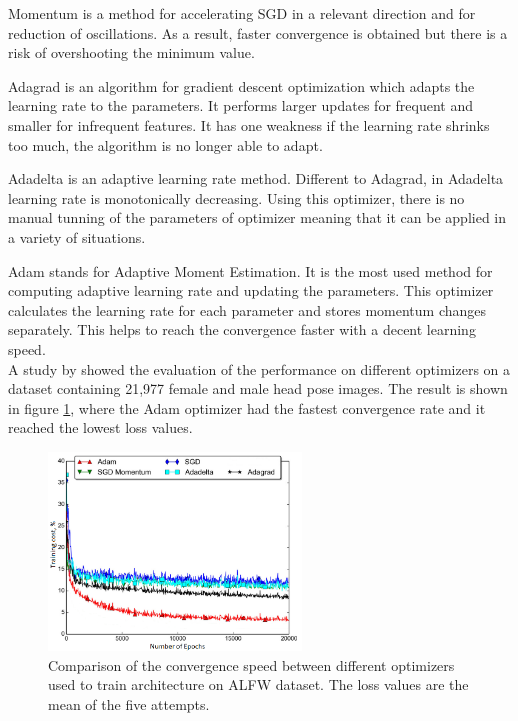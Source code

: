 \noindent
Momentum is a method for accelerating SGD in a relevant direction and for reduction of oscillations. As a result, faster convergence is obtained but there is a risk of overshooting the minimum value.\citep{Qian1999, Ruder2016}

\noindent
Adagrad is an algorithm for gradient descent optimization which adapts the learning rate to the parameters. It performs larger updates for frequent and smaller for infrequent features. It has one weakness if the learning rate shrinks too much, the algorithm is no longer able to adapt.\citep{Ruder2016}

\noindent
Adadelta is an adaptive learning rate method. Different to Adagrad, in Adadelta learning rate is monotonically decreasing. Using this optimizer, there is no manual tunning of the parameters of optimizer meaning that it can be applied in a variety of situations.\citep{Ruder2016}

\noindent
Adam stands for Adaptive Moment Estimation. It is the most used method for computing adaptive learning rate and updating the parameters.  This optimizer calculates the learning rate for each parameter and stores momentum changes separately. This helps to reach the convergence faster with a decent learning speed.\citep{Kingma2015}\\

\noindent
A study by \citeauthor{Patacchiola2017} \citep{Patacchiola2017} showed the evaluation of the performance on different optimizers on a dataset containing 21,977 female and male head pose images. The result is shown in figure \ref{fig:Graphofyrainingcost}, where the Adam optimizer had the fastest convergence rate and it reached the lowest loss values. 

\begin{figure} [H]
\centering
\includegraphics[width=0.6\textwidth]{figures/Graphofyrainingcost}
\caption{Comparison of the convergence speed between different optimizers used to train architecture on ALFW dataset. The loss values are the mean of the five attempts.\citep{Patacchiola2017}}
\label{fig:Graphofyrainingcost}  
\end{figure}

